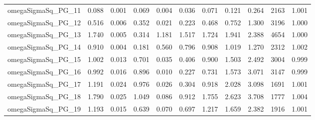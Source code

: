 \documentclass[12pt]{article}
\begin{document}
\begin{longtable}{lrrrrrrrrrr}
omegaSigmaSq\_PG\_11 & 0.088 & 0.001 & 0.069 & 0.004 & 0.036 & 0.071 & 0.121 & 0.264 & 2163 & 1.001 \\
omegaSigmaSq\_PG\_12 & 0.516 & 0.006 & 0.352 & 0.021 & 0.223 & 0.468 & 0.752 & 1.300 & 3196 & 1.000 \\
omegaSigmaSq\_PG\_13 & 1.740 & 0.005 & 0.314 & 1.181 & 1.517 & 1.724 & 1.941 & 2.388 & 4654 & 1.000 \\
omegaSigmaSq\_PG\_14 & 0.910 & 0.004 & 0.181 & 0.560 & 0.796 & 0.908 & 1.019 & 1.270 & 2312 & 1.002 \\
omegaSigmaSq\_PG\_15 & 1.002 & 0.013 & 0.701 & 0.035 & 0.406 & 0.900 & 1.503 & 2.492 & 3004 & 0.999 \\
omegaSigmaSq\_PG\_16 & 0.992 & 0.016 & 0.896 & 0.010 & 0.227 & 0.731 & 1.573 & 3.071 & 3147 & 0.999 \\
omegaSigmaSq\_PG\_17 & 1.191 & 0.024 & 0.976 & 0.026 & 0.304 & 0.918 & 2.028 & 3.098 & 1691 & 1.001 \\
omegaSigmaSq\_PG\_18 & 1.790 & 0.025 & 1.049 & 0.086 & 0.912 & 1.755 & 2.623 & 3.708 & 1777 & 1.004 \\
omegaSigmaSq\_PG\_19 & 1.193 & 0.015 & 0.639 & 0.070 & 0.697 & 1.217 & 1.659 & 2.382 & 1916 & 1.001 \\
\end{longtable}
\endgroup


\newpage
\end{document}
